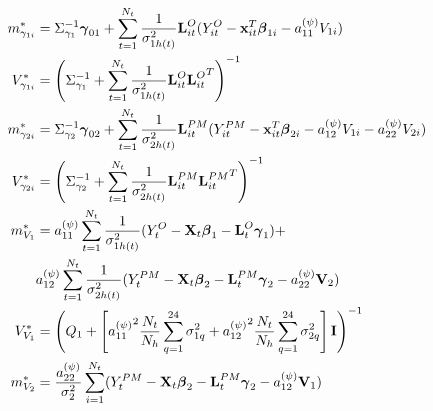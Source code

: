 \documentclass[alpha-refs]{wiley-article}
\newcommand{\bbeta}{ \mbox{\boldmath $ \beta $} }
\newcommand{\bgamma}{ \mbox{\boldmath $\gamma$} }
\newcommand{\bI}{\textbf{I}}
\newcommand{\bL}{\textbf{L}}
\newcommand{\bS}{\textbf{S}}
\newcommand{\bV}{\textbf{V}}
\newcommand{\bx}{\textbf{x}}
\newcommand{\bX}{\textbf{X}}
\begin{document}
{\begin{align*}
m_{\gamma_{1i} }^* &= \Sigma_{\gamma_1}^{-1} \bgamma_{01} + \sum^{N_t}_{t=1}  \frac{1}{\sigma^2_{1h(t)} } {\bL^{O}_{it}} (Y^{O}_{it}- \bx_{it}^T\bbeta_{1i} - a_{11}^{(\psi)} V_{1i} )   \\
V_{\gamma_{1i} }^* &= \left( \Sigma_{\gamma_1}^{-1} + \sum^{N_t}_{t=1} \frac{1}{\sigma^2_{1h(t)} } {\bL^{O}_{it}} {\bL^{O}_{it}}^T  \right)^{-1} \\
m_{\gamma_{2i} }^* &= \Sigma_{\gamma_2}^{-1} \bgamma_{02} + \sum^{N_t}_{t=1}  \frac{1}{\sigma^2_{2h(t)} }{\bL^{PM}_{it}} (Y^{PM}_{it} - \bx_{it}^T\bbeta_{2i} - a_{12}^{(\psi)} V_{1i}- a_{22}^{(\psi)} V_{2i} )   \\
V_{\gamma_{2i} }^* &= \left( \Sigma_{\gamma_2}^{-1} + \sum^{N_t}_{t=1} \frac{1}{\sigma^2_{2h(t)} } {\bL^{PM}_{it}} {\bL^{PM}_{it}}^T  \right)^{-1} \\
m_{V_1}^* &=  a_{11}^{(\psi)}  \sum_{t=1}^{N_t}   \frac{1}{\sigma^2_{1h(t)} }(Y_t^{O} - \bX_t \bbeta_1- \bL^{O}_t\bgamma_{1} ) + \\ & a_{12}^{(\psi)} \sum_{t=1}^{N_t} \frac{1}{\sigma^2_{2h(t)} } (Y_t^{PM} - \bX_t \bbeta_2- \bL^{PM}_t\bgamma_{2}- a_{22}^{(\psi)} \bV_2  )  \\
V_{V_1}^* &= \left( Q_1 + \left[{a_{11}^{(\psi)}}^2 \frac{N_t}{N_h} \sum_{q=1}^{24} \sigma^2_{1q} + {a_{12}^{(\psi)}}^2 \frac{ N_t }{N_h} \sum_{q=1}^{24} \sigma^2_{2q} \right] \bI \right)^{-1} \\
m_{V_2}^* &= \frac{a_{22}^{(\psi)} }{\sigma^2_2} \sum_{i=1}^{N_t} (Y_t^{PM} - \bX_t \bbeta_2-\bL^{PM}_t\bgamma_{2}- a_{12}^{(\psi)} \bV_1 ) \\

\end{align*}}
\end{document}
